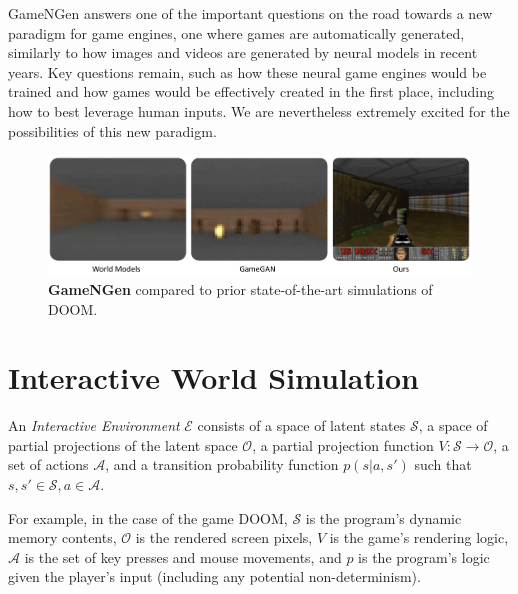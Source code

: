 \documentclass{article} %
\begin{document}
GameNGen answers one of the important questions on the road towards a new paradigm for game engines, one where games are automatically generated, similarly to how images and videos are generated by neural models in recent years.
Key questions remain, such as how these neural game engines would be trained and how games would be effectively created in the first place, including how to best leverage human inputs.
We are nevertheless extremely excited for the possibilities of this new paradigm.

\begin{figure}[ht]
    \centering
    \vspace{-0.1in}
    \includegraphics[width=\textwidth]{figures/compare_to_sota.pdf}
    \caption{
    \textbf{GameNGen} compared to prior state-of-the-art simulations of DOOM.}
    \label{fig:comp_with_prev_sota}
    \vspace{-0.05in}
\end{figure}

\section{Interactive World Simulation}
\label{sec:interactive world sim}

An \emph{Interactive Environment} $\mathcal{E}$ consists of a space of latent states $\mathcal{S}$, a space of partial projections of the latent space $\mathcal{O}$, a partial projection function $V:\mathcal{S} \to \mathcal{O}$, a set of actions $\mathcal{A}$, and a transition probability function $p(s| a, s')$ such that $s, s' \in \mathcal{S}, a \in \mathcal{A}$.

For example, in the case of the game DOOM, $\mathcal{S}$ is the program's dynamic memory contents, $\mathcal{O}$ is the rendered screen pixels, $V$ is the game's rendering logic, $\mathcal{A}$ is the set of key presses and mouse movements, and $p$ is the program's logic given the player's input (including any potential non-determinism).
\end{document}
